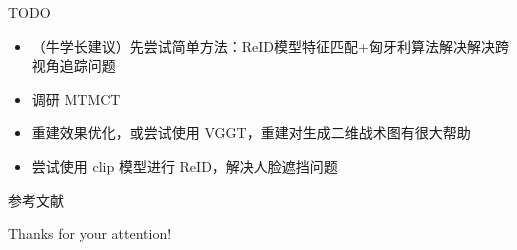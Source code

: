 \documentclass{ctexbeamer}
\begin{document}
\begin{frame}{TODO}
  \begin{itemize}
    \item （牛学长建议）先尝试简单方法：ReID模型特征匹配+匈牙利算法解决解决跨视角追踪问题
    \item 调研 MTMCT
    \item 重建效果优化，或尝试使用 VGGT，重建对生成二维战术图有很大帮助
    \item 尝试使用 clip 模型进行 ReID，解决人脸遮挡问题
  \end{itemize}
\end{frame}

\begin{frame}[allowframebreaks]{参考文献}
  
  
\end{frame}

\begin{frame}
  \begin{center}
    {\Huge\calligra Thanks for your attention!}
  \end{center}
\end{frame}

\end{document}
